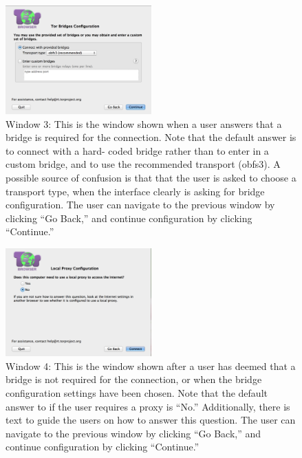 \documentclass{template}
\begin{document}
\begin{figure}[h]
  \centering
    \includegraphics[width=0.5\textwidth]{window3.png}
    \caption{Window 3: This is the window shown when a user answers that a bridge 
    is required for the connection. Note that the default answer is to connect with a hard-
    coded bridge rather than to enter in a custom bridge, and to use the recommended 
    transport (obfs3). A possible source of confusion is that that the user is asked to choose 
    a transport type, when the interface clearly is asking for bridge configuration. The user 
    can navigate to the previous window by clicking ``Go Back,'' and continue configuration 
    by clicking  ``Continue.''}
\label{fig:window3}
\end{figure}

\begin{figure}[h]
  \centering
    \includegraphics[width=0.5\textwidth]{window4.png}
    \caption{Window 4: This is the window shown after a user has deemed that a bridge
    is not required for the connection, or when the bridge configuration settings have been 
    chosen. Note that the default answer to if the user requires a proxy is ``No.'' Additionally,
    there is text to guide the users on how to answer this question. The user 
    can navigate to the previous window by clicking ``Go Back,'' and continue configuration 
    by clicking  ``Continue.''}
\label{fig:window4}
\end{figure}
\end{document}
